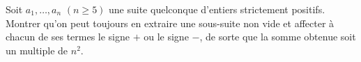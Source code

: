 Soit $a_1, \ldots, a_n$ $(n \geq 5)$ une suite quelconque d'entiers strictement positifs. Montrer qu'on peut toujours en extraire une sous-suite non vide et affecter à chacun de ses termes le signe $+$ ou le signe $-$, de sorte que la somme obtenue soit un multiple de $n^2$.
